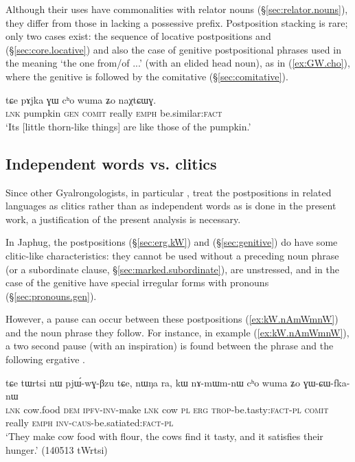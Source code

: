 Although their uses have commonalities with relator nouns (§\ref{sec:relator.nouns}), they differ from those in lacking a possessive prefix. Postposition stacking is rare; only two cases exist: the sequence of locative postpositions  and  (§\ref{sec:core.locative}) and also the case of genitive postpositional phrases used in the meaning `the one from/of ...' (with an elided head noun), as in (\ref{ex:GW.cho}), where the genitive  is followed by the comitative (§\ref{sec:comitative}). 

\begin{exe}
\ex \label{ex:GW.cho}
 \gll tɕe pɤjka ɣɯ cʰo wuma ʑo naχtɕɯɣ. \\
 \textsc{lnk} pumpkin \textsc{gen} \textsc{comit} really \textsc{emph} be.similar:\textsc{fact} \\
 \glt `Its [little thorn-like things] are like those of the pumpkin.' 
 \end{exe}
 
\subsection{Independent words vs. clitics}  \label{ex:word.vs.clitic.postp}  
Since other Gyalrongologists, in particular \citet{jackson98morphology, jackson14morpho}, treat the postpositions in related languages as clitics rather than as independent words as is done in the present work, a justification of the present analysis is necessary.


In Japhug, the postpositions  (§\ref{sec:erg.kW}) and   (§\ref{sec:genitive}) do have some clitic-like characteristics: they cannot be used without a preceding noun phrase (or a subordinate clause, §\ref{sec:marked.subordinate}), are unstressed, and in the case of the genitive have special irregular forms with pronouns (§\ref{sec:pronouns.gen}).

However, a pause can occur between these postpositions (\ref{ex:kW.nAmWmnW}) and the noun phrase they follow. For instance, in example (\ref{ex:kW.nAmWmnW}), a two second pause (with an inspiration) is found between the phrase  and the following ergative . 

\begin{exe}
\ex \label{ex:kW.nAmWmnW}
\gll tɕe tɯrtsi nɯ pjɯ́-wɣ-βzu tɕe, nɯŋa ra, kɯ nɤ-mɯm-nɯ cʰo wuma ʑo ɣɯ-ɕɯ-fka-nɯ \\
\textsc{lnk} cow.food \textsc{dem} \textsc{ipfv}-\textsc{inv}-make \textsc{lnk} cow \textsc{pl} \textsc{erg} \textsc{trop}-be.tasty:\textsc{fact}-\textsc{pl} \textsc{comit} really \textsc{emph} \textsc{inv}-\textsc{caus}-be.satiated:\textsc{fact}-\textsc{pl} \\
\glt `They make cow food with flour, the cows find it tasty, and it satisfies their hunger.' (140513 tWrtsi)
\end{exe}

